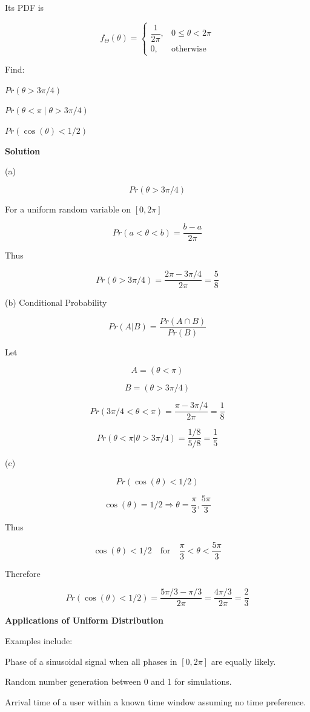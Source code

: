 \documentclass[12pt]{article}
\begin{document}
Its PDF is

\[
f_{\Theta}(\theta)=
\begin{cases}
\dfrac{1}{2\pi}, & 0\le \theta <2\pi \\
0, & \text{otherwise}
\end{cases}
\]

Find:

$Pr(\theta>3\pi/4)$

$Pr(\theta<\pi \mid \theta>3\pi/4)$

$Pr(\cos(\theta)<1/2)$

\textbf{Solution}

(a)

\[
Pr(\theta>3\pi/4)
\]

For a uniform random variable on $[0,2\pi]$

\[
Pr(a<\theta<b)=\frac{b-a}{2\pi}
\]

Thus

\[
Pr(\theta>3\pi/4)=\frac{2\pi-3\pi/4}{2\pi}=\frac{5}{8}
\]

(b) Conditional Probability

\[
Pr(A|B)=\frac{Pr(A\cap B)}{Pr(B)}
\]

Let

\[
A=(\theta<\pi)
\]

\[
B=(\theta>3\pi/4)
\]

\[
Pr(3\pi/4<\theta<\pi)=\frac{\pi-3\pi/4}{2\pi}=\frac{1}{8}
\]

\[
Pr(\theta<\pi|\theta>3\pi/4)=\frac{1/8}{5/8}=\frac{1}{5}
\]

(c)

\[
Pr(\cos(\theta)<1/2)
\]

\[
\cos(\theta)=1/2 \Rightarrow \theta=\frac{\pi}{3},\frac{5\pi}{3}
\]

Thus

\[
\cos(\theta)<1/2 \quad \text{for} \quad \frac{\pi}{3}<\theta<\frac{5\pi}{3}
\]

Therefore

\[
Pr(\cos(\theta)<1/2)=\frac{5\pi/3-\pi/3}{2\pi}
=\frac{4\pi/3}{2\pi}
=\frac{2}{3}
\]

\textbf{Applications of Uniform Distribution}

Examples include:

Phase of a sinusoidal signal when all phases in $[0,2\pi]$ are equally likely.

Random number generation between 0 and 1 for simulations.

Arrival time of a user within a known time window assuming no time preference.
\end{document}
